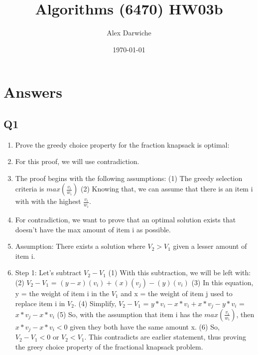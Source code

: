 \documentclass{article}
\title{Algorithms (6470) HW03b}
\author{Alex Darwiche}
\date{\today}
\begin{document}
\maketitle

\section*{Answers}

\subsection*{Q1}
\begin{enumerate}[label=(\alph*)]
    \item Prove the greedy choice property for the fraction knapsack is optimal:
    \item For this proof, we will use contradiction.
    \item The proof begins with the following assumptions:
    \subitem (1) The greedy selection criteria is $max(\frac{v_i}{w_i})$
    \subitem (2) Knowing that, we can assume that there is an item i with with the highest $\frac{v_i}{w_i}$.
    \item For contradiction, we want to prove that an optimal solution exists that doesn't have the max amount of item i as possible.
    \item Assumption: There exists a solution where $V_2 > V_1$ given a lesser amount of item i.
    \item Step 1: Let's subtract $V_2-V_1$
    \subitem (1) With this subtraction, we will be left with: 
    \subitem (2) $V_2-V_1$ = $(y-x)(v_i) + (x)(v_j) - (y)(v_i)$
    \subitem (3) In this equation, y = the weight of item i in the $V_1$ and x = the weight of item j used to replace item i in $V_2$. 
    \subitem (4) Simplify, $V_2-V_1$ = $y*v_i-x*v_i + x*v_j - y*v_i$ = $x*v_j - x*v_i$
    \subitem (5) So, with the assumption that item i has the $max(\frac{v_i}{w_i})$, then $x*v_j - x*v_i < 0$ given they both have the same amount x.
    \subitem (6) So, $V_2-V_1 < 0$ or $V_2 < V_1$. This contradicts are earlier statement, thus proving the greey choice property of the fractional knapsack problem.

\end{enumerate}

\end{document}
